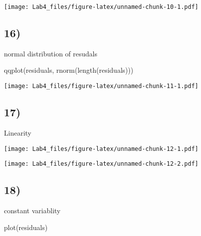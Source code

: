 \documentclass[
]{article}
\newenvironment{Shaded}{\begin{snugshade}}{\end{snugshade}}
\newcommand{\FunctionTok}[1]{\textcolor[rgb]{0.00,0.00,0.00}{#1}}
\newcommand{\NormalTok}[1]{#1}
\newcommand{\SpecialCharTok}[1]{\textcolor[rgb]{0.00,0.00,0.00}{#1}}
\begin{document}
\texttt{[image: Lab4\_files/figure-latex/unnamed-chunk-10-1.pdf]}

\hypertarget{section-15}{%
\subsection{16)}\label{section-15}}

normal distribution of resudals

\begin{Shaded}
\begin{Highlighting}[]
\FunctionTok{qqplot}\NormalTok{(residuals, }\FunctionTok{rnorm}\NormalTok{(}\FunctionTok{length}\NormalTok{(residuals)))}
\end{Highlighting}
\end{Shaded}

\texttt{[image: Lab4\_files/figure-latex/unnamed-chunk-11-1.pdf]}

\hypertarget{section-16}{%
\subsection{17)}\label{section-16}}

Linearity

\begin{Shaded}
\end{Shaded}

\texttt{[image: Lab4\_files/figure-latex/unnamed-chunk-12-1.pdf]}

\begin{Shaded}
\end{Shaded}

\texttt{[image: Lab4\_files/figure-latex/unnamed-chunk-12-2.pdf]}

\hypertarget{section-17}{%
\subsection{18)}\label{section-17}}

constant variablity

\begin{Shaded}
\begin{Highlighting}[]
\FunctionTok{plot}\NormalTok{(residuals)}
\end{Highlighting}
\end{Shaded}
\end{document}
